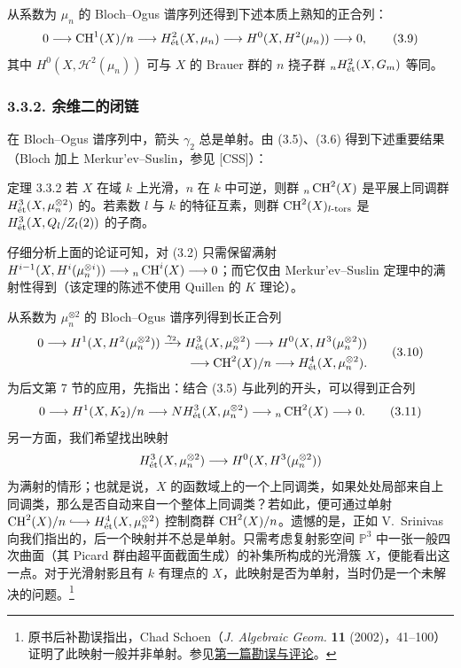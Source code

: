 从系数为 $\mu_n$ 的 Bloch--Ogus 谱序列还得到下述本质上熟知的正合列：
\begin{equation*}
0\longrightarrow\operatorname{CH}^1(X)/n\longrightarrow H^2_{\mathrm{\acute et}}(X,\mu_n)\longrightarrow H^0(X,H^2(\mu_n))\longrightarrow0,\tag{3.9}
\end{equation*}
其中 $H^0(X,\mathcal H^2(\mu_n))$ 可与 $X$ 的 Brauer 群的 $n$ 挠子群 ${}_nH^2_{\mathrm{\acute et}}(X,G_m)$ 等同。

\subsubsection*{3.3.2. 余维二的闭链}
在 Bloch--Ogus 谱序列中，箭头 $\gamma_2$ 总是单射。由 (3.5)、(3.6) 得到下述重要结果（Bloch 加上 Merkur'ev--Suslin，参见 [CSS]）：
\begin{statement}{定理 3.3.2}
若 $X$ 在域 $k$ 上光滑，$n$ 在 $k$ 中可逆，则群 ${}_n\operatorname{CH}^2(X)$ 是平展上同调群 $H^3_{\mathrm{\acute et}}(X,\mu_n^{\otimes2})$ 的。若素数 $l$ 与 $k$ 的特征互素，则群 $\operatorname{CH}^2(X)_{l\text{-}\mathrm{tors}}$ 是 $H^3_{\mathrm{\acute et}}(X,Q_l/Z_l(2))$ 的子商。
\end{statement}
仔细分析上面的论证可知，对 (3.2) 只需保留满射 $H^{i-1}(X,H^i(\mu_n^{\otimes i}))\longrightarrow{}_n\operatorname{CH}^i(X)\longrightarrow0$；而它仅由 Merkur'ev--Suslin 定理中的满射性得到（该定理的陈述不使用 Quillen 的 $K$ 理论）。

从系数为 $\mu_n^{\otimes2}$ 的 Bloch--Ogus 谱序列得到长正合列
\begin{equation*}
\begin{split}
0\longrightarrow H^1(X,H^2(\mu_n^{\otimes2}))\xrightarrow{\gamma_2}H^3_{\mathrm{\acute et}}(X,\mu_n^{\otimes2})\longrightarrow H^0(X,H^3(\mu_n^{\otimes2}))\\
\longrightarrow\operatorname{CH}^2(X)/n\longrightarrow H^4_{\mathrm{\acute et}}(X,\mu_n^{\otimes2}).
\end{split}\tag{3.10}
\end{equation*}
为后文第 7 节的应用，先指出：结合 (3.5) 与此列的开头，可以得到正合列
\begin{equation*}
0\longrightarrow H^1(X,K_2)/n\longrightarrow NH^3_{\mathrm{\acute et}}(X,\mu_n^{\otimes2})\longrightarrow{}_n\operatorname{CH}^2(X)\longrightarrow0.\tag{3.11}
\end{equation*}
另一方面，我们希望找出映射
\[
H^3_{\mathrm{\acute et}}(X,\mu_n^{\otimes2})\longrightarrow H^0(X,H^3(\mu_n^{\otimes2}))
\]
为满射的情形；也就是说，$X$ 的函数域上的一个上同调类，如果处处局部来自上同调类，那么是否自动来自一个整体上同调类？若如此，便可通过单射 $\CH^2(X)/n\lhook\joinrel\longrightarrow H^4_{\et}(X,\mu_n^{\otimes2})$ 控制商群 $\operatorname{CH}^2(X)/n$。遗憾的是，正如 V.~Srinivas 向我们指出的，后一个映射并不总是单射。只需考虑复射影空间 $\mathbb P^3$ 中一张一般四次曲面（其 Picard 群由超平面截面生成）的补集所构成的光滑簇 $X$，便能看出这一点。对于光滑射影且有 $k$ 有理点的 $X$，此映射是否为单射，当时仍是一个未解决的问题。\footnote{原书后补勘误指出，Chad Schoen（\emph{J. Algebraic Geom.} \textbf{11} (2002)，41--100）证明了此映射一般并非单射。参见\hyperref[errata-ct]{第一篇勘误与评论}。}


